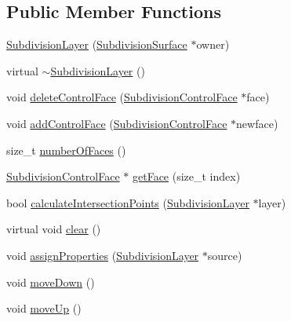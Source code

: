 \subsection*{Public Member Functions}
\begin{DoxyCompactItemize}
\item 
\hyperlink{classShipCADGeometry_1_1SubdivisionLayer_a788864a40265b764b8d97d9a9cbbbd13}{Subdivision\-Layer} (\hyperlink{classShipCADGeometry_1_1SubdivisionSurface}{Subdivision\-Surface} $\ast$owner)
\item 
virtual \hyperlink{classShipCADGeometry_1_1SubdivisionLayer_a4e852a07f46e57f28ffedd4a68c2f4c4}{$\sim$\-Subdivision\-Layer} ()
\item 
void \hyperlink{classShipCADGeometry_1_1SubdivisionLayer_a45b3af65b8b11dd2bf566a454bc125bd}{delete\-Control\-Face} (\hyperlink{classShipCADGeometry_1_1SubdivisionControlFace}{Subdivision\-Control\-Face} $\ast$face)
\item 
void \hyperlink{classShipCADGeometry_1_1SubdivisionLayer_a3c966ebc7e2c1f516f2329324d5658e2}{add\-Control\-Face} (\hyperlink{classShipCADGeometry_1_1SubdivisionControlFace}{Subdivision\-Control\-Face} $\ast$newface)
\item 
size\-\_\-t \hyperlink{classShipCADGeometry_1_1SubdivisionLayer_ac25e800b3f77d61413272a06cb616813}{number\-Of\-Faces} ()
\item 
\hyperlink{classShipCADGeometry_1_1SubdivisionControlFace}{Subdivision\-Control\-Face} $\ast$ \hyperlink{classShipCADGeometry_1_1SubdivisionLayer_a2e1538a000268fe5f56bf2bea4973c23}{get\-Face} (size\-\_\-t index)
\item 
bool \hyperlink{classShipCADGeometry_1_1SubdivisionLayer_ab2d11ebf60ad6edd818eb0c42971946c}{calculate\-Intersection\-Points} (\hyperlink{classShipCADGeometry_1_1SubdivisionLayer}{Subdivision\-Layer} $\ast$layer)
\item 
virtual void \hyperlink{classShipCADGeometry_1_1SubdivisionLayer_a7046d17ba87dd5ce7399f22ae327fc6e}{clear} ()
\item 
void \hyperlink{classShipCADGeometry_1_1SubdivisionLayer_a319ae070f596e92307671cda0a607887}{assign\-Properties} (\hyperlink{classShipCADGeometry_1_1SubdivisionLayer}{Subdivision\-Layer} $\ast$source)
\item 
void \hyperlink{classShipCADGeometry_1_1SubdivisionLayer_a75d5f29031d9c93f291d370c79614e87}{move\-Down} ()
\item 
void \hyperlink{classShipCADGeometry_1_1SubdivisionLayer_aa5fc01f512f9d01f49e05c1608433654}{move\-Up} ()

\end{DoxyCompactItemize}
